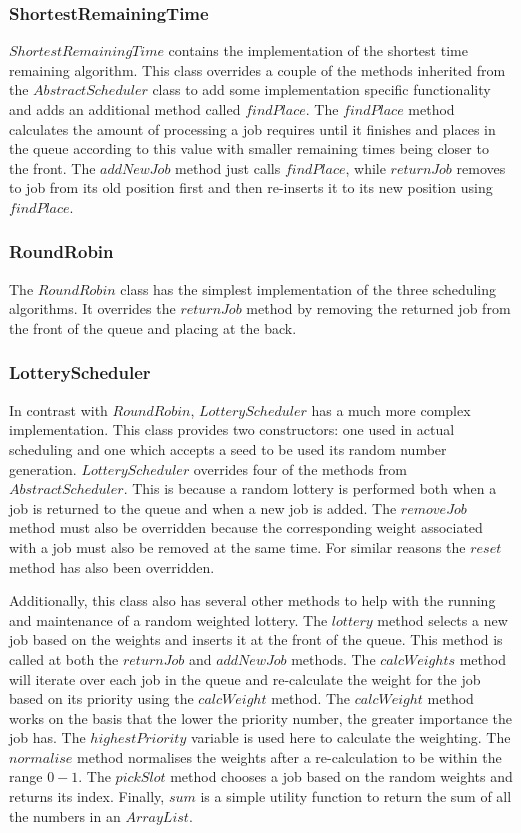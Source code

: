 \documentclass{article}
\begin{document}
\subsubsection{ShortestRemainingTime}
$ShortestRemainingTime$ contains the implementation of the shortest time remaining algorithm. This class overrides a couple of the methods inherited from the $AbstractScheduler$ class to add some implementation specific functionality and adds an additional method called $findPlace$. The $findPlace$ method calculates the amount of processing a job requires until it finishes and places in the queue according to this value with smaller remaining times being closer to the front. The $addNewJob$ method just calls $findPlace$, while $returnJob$ removes to job from its old position first and then re-inserts it to its new position using $findPlace$.

\subsubsection{RoundRobin}
The $RoundRobin$ class has the simplest implementation of the three scheduling algorithms. It overrides the $returnJob$ method by removing the returned job from the front of the queue and placing at the back.

\subsubsection{LotteryScheduler}
In contrast with $RoundRobin$, $LotteryScheduler$ has a much more complex implementation. This class provides two constructors: one used in actual scheduling and one which accepts a seed to be used its random number generation. $LotteryScheduler$ overrides four of the methods from $AbstractScheduler$. This is because a random lottery is performed both when a job is returned to the queue and when a new job is added. The $removeJob$ method must also be overridden because the corresponding weight associated with a job must also be removed at the same time. For similar reasons the $reset$ method has also been overridden.

Additionally, this class also has several other methods to help with the running and maintenance of a random weighted lottery. The $lottery$ method selects a new job based on the weights and inserts it at the front of the queue. This method is called at both the $returnJob$ and $addNewJob$ methods. The $calcWeights$ method will iterate over each job in the queue and re-calculate the weight for the job based on its priority using the $calcWeight$ method. The $calcWeight$ method works on the basis that the lower the priority number, the greater importance the job has. The $highestPriority$ variable is used here to calculate the weighting. The $normalise$ method normalises the weights after a re-calculation to be within the range $0-1$. The $pickSlot$ method chooses a job based on the random weights and returns its index. Finally, $sum$ is a simple utility function to return the sum of all the numbers in an $ArrayList$.
\end{document}
